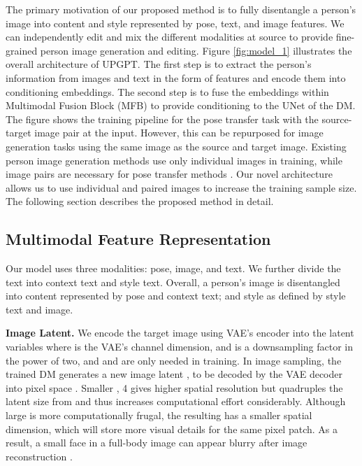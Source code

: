 \documentclass[10pt,twocolumn,letterpaper]{article}
\begin{document}
The primary motivation of our proposed method is to fully disentangle a person's image into content and style represented by pose, text, and image features. We can independently edit and mix the different modalities at source to provide fine-grained person image generation and editing. Figure \ref{fig:model_1} illustrates the overall architecture of UPGPT. The first step is to extract the person's information from images and text in the form of features and encode them into conditioning embeddings. The second step is to fuse the embeddings within Multimodal Fusion Block (MFB) to provide conditioning to the UNet of the DM. The figure shows the training pipeline for the pose transfer task with the source-target image pair at the input. However, this can be repurposed for image generation tasks using the same image as the source and target image. Existing person image generation methods \cite{kpe, text2human, human_diffusion} use only individual images in training, while image pairs are necessary for pose transfer methods \cite{patn, Yang2020, gfla, adgan, pise, casd, nted, persion_dm}. Our novel architecture allows us to use individual and paired images to increase the training sample size. The following section describes the proposed method in detail.

\subsection{Multimodal Feature Representation}
Our model uses three modalities: pose, image, and text. We further divide the text into context text and style text. Overall, a person's image is disentangled into content represented by pose and context text; and style as defined by style text and image.

\noindent\textbf{Image Latent.}
We encode the target image  using VAE's \cite{vae} encoder into the latent variables  where  is the VAE's channel dimension, and  is a downsampling factor in the power of two, and  and  are only needed in training. In image sampling, the trained DM generates a new image latent ,  to be decoded by the VAE decoder into pixel space . Smaller  \eg, 4 gives higher spatial resolution but quadruples the latent size from  and thus increases computational effort considerably. Although large  is more computationally frugal, the resulting  has a smaller spatial dimension, which will store more visual details for the same pixel patch. As a result, a small face in a full-body image can appear blurry after image reconstruction . 
\end{document}
